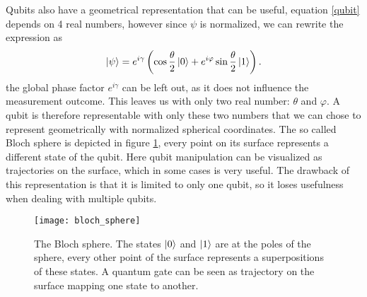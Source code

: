 Qubits also have a geometrical representation that can be useful, equation \eqref{qubit} depends on 4 real numbers, however since $\psi$ is normalized, we can rewrite the expression as
\begin{equation}
\ket{\psi} = e^{i\gamma}\left(\cos\frac{\theta}{2}\ket{0} + e^{i\varphi}\sin\frac{\theta}{2}\ket{1}\right).
\end{equation}
the global phase factor $e^{i\gamma}$ can be left out, as it does not influence the measurement outcome. This leaves us with only two real number: $\theta$ and $\varphi$. A qubit is therefore representable with only these two numbers that we can chose to represent geometrically with normalized spherical coordinates. The so called Bloch sphere is depicted in figure \ref{blochsphere}, every point on its surface represents a different state of the qubit. Here qubit manipulation can be visualized as trajectories on the surface, which in some cases is very useful. The drawback of this representation is that it is limited to only one qubit, so it loses usefulness when dealing with multiple qubits.
\begin{figure}[H]
\centering
\texttt{[image: bloch\_sphere]}
\caption{The Bloch sphere. The states $\ket{0}$ and $\ket{1}$ are at the poles of the sphere, every other point of the surface represents a superpositions of these states. A quantum gate can be seen as trajectory on the surface mapping one state to another.}
\label{blochsphere}
\end{figure}


